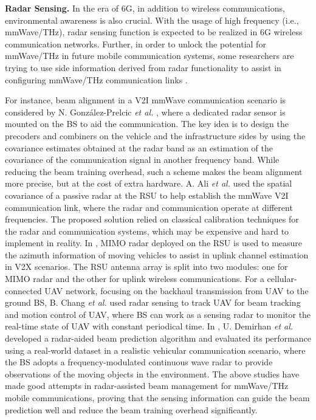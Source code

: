 \documentclass[journal,comsoc]{IEEEtran}
\begin{document}
{\bf{Radar Sensing.}} In the era of 6G, in addition to wireless communications, environmental awareness is also crucial. With the usage of high frequency (i.e., mmWave/THz), radar sensing function is expected to be realized in 6G wireless communication networks. Further, in order to unlock the potential for mmWave/THz in future mobile communication systems, some researchers are trying to use side information derived from radar functionality to assist in configuring mmWave/THz communication links \cite{Radar-aided-beam-alignment-V2I-2016,Passive-Radar-Roadside-Unit-2020,MIMO-Radar-mmWave-Channel-Estimation-2021,Integrated-Scheduling-UAV-2022,DRL-Beam-Management-ISAC-HSR-2022,Radar-6G-Beam-Prediction-2022}.

For instance, beam alignment in a V2I mmWave communication scenario is considered by N. Gonz\'{a}lez-Prelcic \emph{et al.} \cite{Radar-aided-beam-alignment-V2I-2016}, where a dedicated radar sensor is mounted on the BS to aid the communication. The key idea is to design the precoders and combiners on the vehicle and the infrastructure sides by using the covariance estimates obtained at the radar band as an estimation of the covariance of the communication signal in another frequency band. While reducing the beam training overhead, such a scheme makes the beam alignment more precise, but at the cost of extra hardware. A. Ali \emph{et al.} \cite{Passive-Radar-Roadside-Unit-2020} used the spatial covariance of a passive radar at the RSU to help establish the mmWave V2I communication link, where the radar and communication operate at different frequencies. The proposed solution relied on classical calibration techniques for the radar and communication systems, which may be expensive and hard to implement in reality. In \cite{MIMO-Radar-mmWave-Channel-Estimation-2021}, MIMO radar deployed on the RSU is used to measure the azimuth information of moving vehicles to assist in uplink channel estimation in V2X scenarios. The RSU antenna array is split into two modules: one for MIMO radar and the other for uplink wireless communications. For a cellular-connected UAV network, focusing on the backhaul transmission from UAV to the ground BS, B. Chang \emph{et al.} \cite{Integrated-Scheduling-UAV-2022} used radar sensing to track UAV for beam tracking and motion control of UAV, where BS can work as a sensing radar to monitor the real-time state of UAV with constant periodical time. In \cite{Radar-6G-Beam-Prediction-2022}, U. Demirhan \emph{et al.} developed a radar-aided beam prediction algorithm and evaluated its performance using a real-world dataset in a realistic vehicular communication scenario, where the BS adopts a frequency-modulated continuous wave radar to provide observations of the moving objects in the environment. The above studies have made good attempts in radar-assisted beam management for mmWave/THz mobile  communications, proving that the sensing information can guide the beam prediction well and reduce the beam training overhead significantly.
\end{document}
